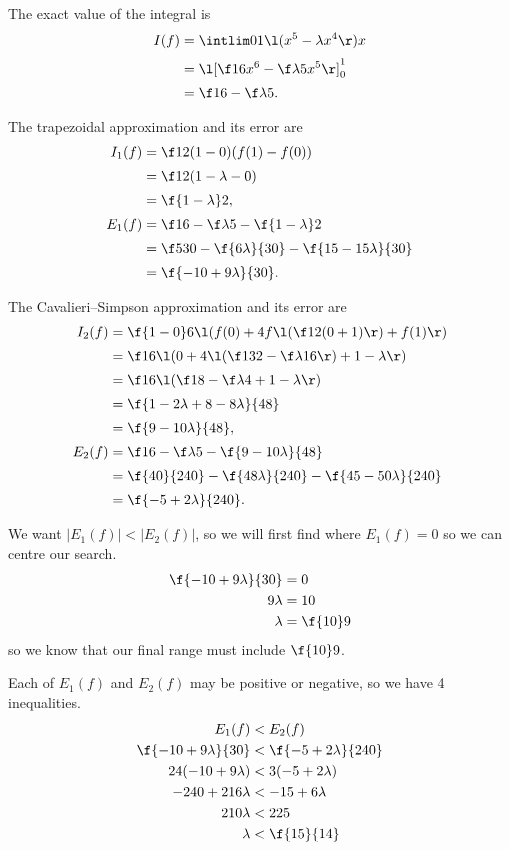 \documentclass[a4paper]{article}
\begin{document}
The exact value of the integral is
\begin{align*}
I(f) &= \intlim 01 {\l( x^5 - \lambda x^4 \r)} x \\[0.5ex]
&= {\l[ \f16 x^6 - \f\lambda5 x^5 \r]}_0^1 \\[0.5ex]
&= \f16 - \f\lambda5.
\end{align*}

The trapezoidal approximation and its error are
\begin{align*}
I_1(f) &= \f12 (1 - 0) (f(1) - f(0)) \\[0.5ex]
&= \f12 (1 - \lambda - 0) \\[0.5ex]
&= \f{1 - \lambda}2, \\[0.5ex]
E_1(f) &= \f16 - \f\lambda5 - \f{1 - \lambda}2 \\[0.5ex]
&= \f5{30} - \f{6 \lambda}{30} - \f{15 - 15 \lambda}{30} \\[0.5ex]
&= \f{-10 + 9 \lambda}{30}.
\end{align*}

The Cavalieri--Simpson approximation and its error are %
\begin{align*}
I_2(f) &= \f{1 - 0}6 \l( f(0) + 4 f\l( \f12 (0 + 1) \r) + f(1) \r) \\[0.5ex]
&= \f16 \l( 0 + 4 \l( \f1{32} - \f\lambda{16} \r) + 1 - \lambda \r) \\[0.5ex]
&= \f16 \l( \f18 - \f\lambda4 + 1 - \lambda \r) \\[0.5ex]
&= \f{1 - 2 \lambda + 8 - 8 \lambda}{48} \\[0.5ex]
&= \f{9 - 10 \lambda}{48}, \\[0.5ex]
E_2(f) &= \f16 - \f\lambda5 - \f{9 - 10 \lambda}{48} \\[0.5ex]
&= \f{40}{240} - \f{48 \lambda}{240} - \f{45 - 50 \lambda}{240} \\[0.5ex]
&= \f{-5 + 2 \lambda}{240}.
\end{align*}

We want $|E_1(f)| < |E_2(f)|$, so we will first find where $E_1(f) = 0$ so we can centre our search.
\begin{align*}
\f{-10 + 9 \lambda}{30} &= 0 \\
9 \lambda &= 10 \\
\lambda &= \f{10}9
\end{align*}
so we know that our final range must include $\f{10}9$.

Each of $E_1(f)$ and $E_2(f)$ may be positive or negative, so we have 4 inequalities.
\begin{align*}
E_1(f) &< E_2(f) \\
\f{-10 + 9 \lambda}{30} &< \f{-5 + 2 \lambda}{240} \\
24(-10 + 9 \lambda) &< 3(-5 + 2 \lambda) \\
-240 + 216 \lambda &< -15 + 6 \lambda \\
210 \lambda &< 225 \\
\lambda &< \f{15}{14}
\end{align*}
\end{document}

